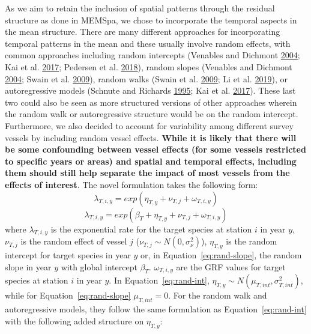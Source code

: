 \documentclass[12pt]{article}\usepackage[]{graphicx}\usepackage[]{color}
\begin{document}
As we aim to retain the inclusion of spatial patterns through the residual structure as done in MEMSpa, we chose to incorporate the temporal aspects in the mean structure. There are many different approaches for incorporating temporal patterns in the mean and these usually involve random effects, with common approaches including random intercepts (Venables and Dichmont \protect\hyperlink{ref-Venables2004}{2004}; Kai et al. \protect\hyperlink{ref-Kai2017}{2017}; Pedersen et al. \protect\hyperlink{ref-Pedersen2018}{2018}), random slopes (Venables and Dichmont \protect\hyperlink{ref-Venables2004}{2004}; Swain et al. \protect\hyperlink{ref-Swain2009}{2009}), random walks (Swain et al. \protect\hyperlink{ref-Swain2009}{2009}; Li et al. \protect\hyperlink{ref-Li2019}{2019}), or autoregressive models (Schnute and Richards \protect\hyperlink{ref-Schnute1995}{1995}; Kai et al. \protect\hyperlink{ref-Kai2017}{2017}). These last two could also be seen as more structured versions of other approaches wherein the random walk or autoregressive structure would be on the random intercept. Furthermore, we also decided to account for variability among different survey vessels by including random vessel effects. \textbf{While it is likely that there will be some confounding between vessel effects (for some vessels restricted to specific years or areas) and spatial and temporal effects, including them should still help separate the impact of most vessels from the effects of interest}. The novel formulation takes the following form:
\begin{equation}\label{eq:rand-int}
\lambda_{T,i,y} = exp(\eta_{T,y}+ \nu_{T,j}+\omega_{T,i,y})
\end{equation} \begin{equation}\label{eq:rand-slope}
\lambda_{T,i,y} = exp(\beta_T+\eta_{T,y}+ \nu_{T,j}+\omega_{T,i,y})
\end{equation}
where \(\lambda_{T,i,y}\) is the exponential rate for the target species at station \(i\) in year \(y\), \(\nu_{T,j}\) is the random effect of vessel \(j\) (\(\nu_{T,j} \sim N(0,\sigma_\nu^2)\)), \(\eta_{T,y}\) is the random intercept for target species in year \(y\) or, in Equation~\ref{eq:rand-slope}, the random slope in year \(y\) with global intercept \(\beta_T\). \(\omega_{T,i,y}\) are the GRF values for target species at station \(i\) in year \(y\). In Equation~\ref{eq:rand-int}, \(\eta_{T,y} \sim N(\mu_{T,int},\sigma_{T,int}^2)\), while for Equation~\ref{eq:rand-slope} \(\mu_{T,int}=0\). For the random walk and autoregressive models, they follow the same formulation as Equation~\ref{eq:rand-int} with the following added structure on \(\eta_{T,y}\):
\end{document}
